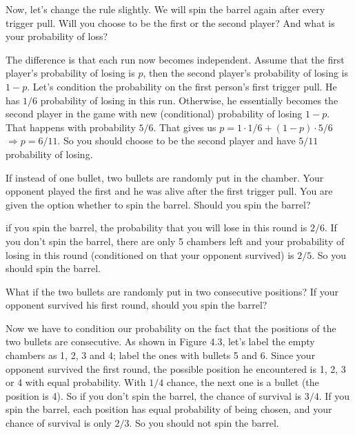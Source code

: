 \begin{problem}{}
Now, let's change the rule slightly. We will spin the barrel again after every trigger pull.
Will you choose to be the first or the second player? And what is your probability of loss?
\end{problem}

\begin{solution}
The difference is that each run now becomes independent. Assume that the first player's
probability of losing is $p$, then the second player's probability of losing is $1-p$. Let's condition the
probability on the first person's first trigger pull. He has $1/6$ probability of losing in this run.
Otherwise, he essentially becomes the second player in the game with new (conditional) probability
of losing $1-p$. That happens with probability $5/6$. That gives us $p=1\cdot1/6+(1-p)\cdot5/6$
$\Rightarrow p=6/11$. So you should choose to be the second player and have $5/11$ probability of losing.
\end{solution}

\begin{problem}{}
If instead of one bullet, two bullets are randomly put in the chamber. Your opponent played the first and he was alive after the first trigger pull. You are given the option
whether to spin the barrel. Should you spin the barrel?
\end{problem}

\begin{solution}
if you spin the barrel, the probability that you will lose in this round is $2/6$. If you don't spin the barrel, there are only 5 chambers left and your probability of losing in
this round (conditioned on that your opponent survived) is $2/5$. So you should spin the
barrel.
\end{solution}

\begin{problem}{}
What if the two bullets are randomly put in two consecutive positions? If your opponent
survived his first round, should you spin the barrel?
\end{problem}

\begin{solution}
Now we have to condition our probability on the fact that the positions of the two bullets are consecutive.
As shown in Figure 4.3, let's label the empty chambers as 1, 2, 3 and 4; label the ones with bullets
5 and 6. Since your opponent survived the first round, the possible position he encountered is 1, 2, 3 or 4
with equal probability. With $1/4$ chance, the next one is a bullet (the position is 4). So if you don't spin the barrel,
the chance of survival is $3/4$. If you spin the barrel, each position has equal probability of being
chosen, and your chance of survival is only $2/3$. So you should not spin the barrel.
\end{solution}

